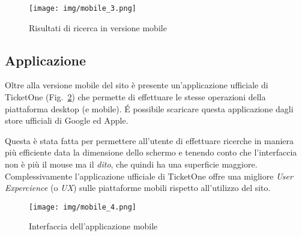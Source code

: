 	\begin{figure}[H]
		\centering
		\texttt{[image: img/mobile\_3.png]}
		\caption{Risultati di ricerca in versione mobile}
		\label{mobile3}
	\end{figure}

\subsection{Applicazione}

	Oltre alla versione mobile del sito è presente un'applicazione ufficiale di TicketOne (Fig.~\ref{mobile4}) che permette di effettuare le stesse operazioni della piattaforma desktop (e mobile).
	\'E possibile scaricare questa applicazione dagli store ufficiali di Google ed Apple.
	\par Questa è stata fatta per permettere all'utente di effettuare ricerche in maniera più efficiente data la dimensione dello schermo e tenendo conto che l'interfaccia non è più il mouse ma il \textit{dito}, che quindi ha una superficie maggiore.
	Complessivamente l'applicazione ufficiale di TicketOne offre una migliore \textit{User Expercience} (o \textit{UX}) sulle piattaforme mobili rispetto all'utilizzo del sito.
	
	\begin{figure}[H]
		\centering
		\texttt{[image: img/mobile\_4.png]}
		\caption{Interfaccia dell'applicazione mobile}
		\label{mobile4}
	\end{figure}